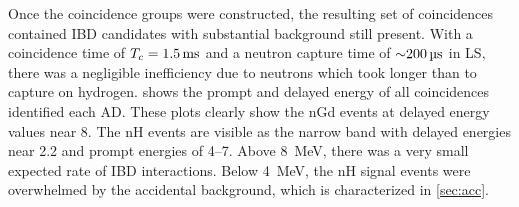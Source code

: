 
Once the coincidence groups were constructed,
the resulting set of  coincidences
contained IBD candidates
with substantial background still present.
With a coincidence time of $\tc=\SI{1.5}{\ms}$
and a neutron capture time of $\SI{\sim200}{\us}$ in LS,
there was a negligible inefficiency due to neutrons
which took longer than \tc{} to capture on hydrogen.
 shows the prompt and delayed energy
of all  coincidences identified each AD.
These plots clearly show the nGd events
at delayed energy values near \SI{8}{\mev}.
The nH events are visible as the narrow band with
delayed energies near \SI{2.2}{\mev}
and prompt energies of \SIrange{4}{7}{\mev}.
Above \SI{8}{\MeV}, there was a very small expected rate of IBD interactions.
Below \SI{4}{\MeV},
the nH signal events were overwhelmed by the accidental background,
which is characterized in \cref{sec:acc}.

